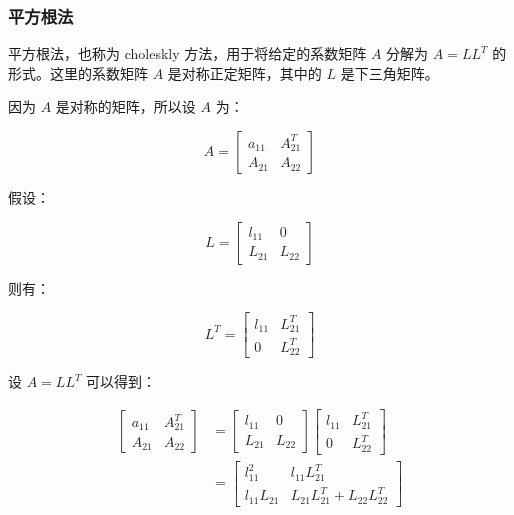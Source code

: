 \subsubsection{}

\subsubsection{平方根法}

平方根法，也称为 choleskly 方法，用于将给定的系数矩阵 \(A\) 分解为
\(A = L L^T\) 的形式。这里的系数矩阵 \(A\) 是对称正定矩阵，其中的 \(L\)
是下三角矩阵。

因为 \(A\) 是对称的矩阵，所以设 \(A\) 为：

\[
    A =
    \begin{bmatrix}
        a_{11} & A_{21}^T \\
        A_{21} & A_{22}
    \end{bmatrix}
\]

假设：

\[
    L =
    \begin{bmatrix}
        l_{11} & 0      \\
        L_{21} & L_{22}
    \end{bmatrix}
\]

则有：

\[
    L^T =
    \begin{bmatrix}
        l_{11} & L_{21}^T \\
        0      & L_{22}^T
    \end{bmatrix}
\]

设 \(A = LL^T\) 可以得到：

\[
    \begin{aligned}
        \begin{bmatrix}
            a_{11} & A_{21}^T \\
            A_{21} & A_{22}
        \end{bmatrix}
         & =
        \begin{bmatrix}
            l_{11} & 0      \\
            L_{21} & L_{22}
        \end{bmatrix}
        \begin{bmatrix}
            l_{11} & L_{21}^T \\
            0      & L_{22}^T
        \end{bmatrix} \\
         & =
        \begin{bmatrix}
            l_{11}^2     & l_{11}L_{21}^T                  \\
            l_{11}L_{21} & L_{21}L_{21}^T + L_{22}L_{22}^T
        \end{bmatrix}
    \end{aligned}
\]

